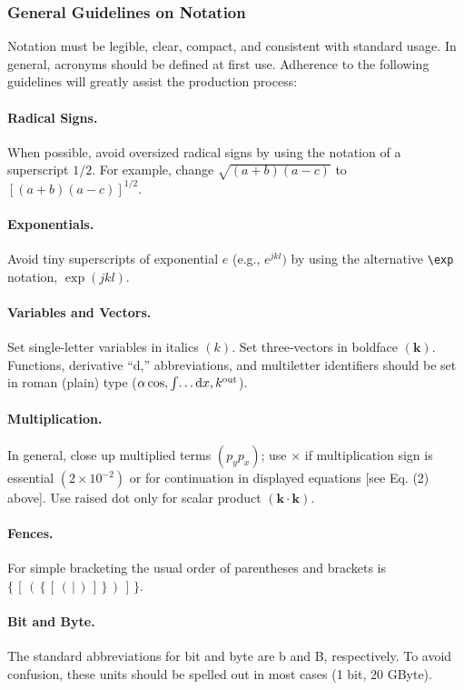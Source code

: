 \documentclass[letterpaper,11pt]{article}   %
\begin{document}
\subsubsection{General Guidelines on Notation} Notation must be
legible, clear, compact, and consistent with standard usage. In
general, acronyms should be defined at first use. Adherence to the
following guidelines will greatly assist the production process:

\paragraph*{\bf Radical Signs.}
When possible, avoid oversized radical signs
by using the notation of a superscript $1/2$. For example, change
$\sqrt{(a + b)(a - c)}$ to $[(a + b)(a - c)]^{1/2}$.

\paragraph*{\bf Exponentials.} Avoid tiny superscripts of exponential $e$ (e.g.,
$e^{jkl})$ by using the alternative \verb+\exp+ notation,
$\exp(jkl)$.

\paragraph*{\bf Variables and Vectors.}
Set single-letter variables in italics $(k)$. Set three-vectors in
boldface $(\mathbf{k})$. Functions, derivative ``d,''
abbreviations, and multiletter identifiers should be set in roman
(plain) type  ($\alpha \cos, \int\!\dots{\rm d}x, k^{\rm out}$).

\paragraph*{\bf Multiplication.}
In general, close up multiplied terms $(p_yp_x)$;
use $\times$ if multiplication sign is essential $(2 \times
10^{-2})$ or for continuation in displayed equations [see Eq. (2)
above]. Use raised dot only for scalar product $(\mathbf{k \cdot
k})$.

\paragraph*{\bf Fences.}
For simple bracketing the usual order of parentheses and brackets
is $\{ \, [  \, (  \,  \{  \, [  \, (  \, |  \, )  \, ]  \, \} \,
)  \, ]  \, \}$.

\paragraph*{\bf Bit and Byte.}
The standard abbreviations for bit
and byte are b and B, respectively. To avoid confusion, these
units should be spelled out in most cases (1 bit, 20 GByte).
\end{document}
